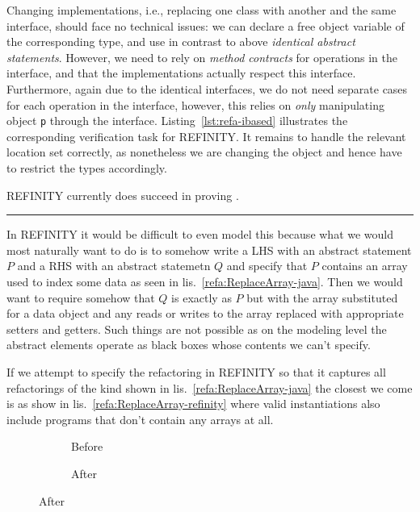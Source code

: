 Changing implementations, i.e., replacing one class with another and the same interface,
should face no technical issues: we can declare a free object variable of the corresponding type,
and use in contrast to above \textit{identical abstract statements}.
However, we need to rely on \textit{method contracts} for operations in the interface, and that the implementations actually respect this interface.
Furthermore, again due to the identical interfaces, we do not need separate cases for each operation in the interface,
however, this relies on \textit{only} manipulating object \texttt{p} through the interface.
Listing~\ref{lst:refa-ibased} illustrates the corresponding verification task for REFINITY.
It remains to handle the relevant location set correctly, as nonetheless we are changing the object and hence have to restrict the types accordingly.

REFINITY currently does  succeed in proving .

\noindent\rule{\textwidth}{2pt}


In REFINITY it would be difficult to even model this because what we would most naturally want to do is to somehow write a LHS with an abstract statement $P$ and a RHS with an abstract statemetn $Q$ and specify that $P$ contains an array used to index some data as seen in lis.~\ref{refa:ReplaceArray-java}. Then we would want to require somehow that $Q$ is exactly as $P$ but with the array substituted for a data object and any reads or writes to the array replaced with appropriate setters and getters. Such things are not possible as on the modeling level the abstract elements operate as black boxes whose contents we can't specify.

If we attempt to specify the refactoring in REFINITY so that it captures all refactorings of the kind shown in lis.~\ref{refa:ReplaceArray-java} the closest we come is as show in lis.~\ref{refa:ReplaceArray-refinity} where valid instantiations
also include programs that don't contain any arrays at all.

\begin{figure}
  \begin{subfigure}[h]{.45\linewidth} 
    
    \caption{Before}
    \label{refa:ReplaceArray-refinity-before}   
  \end{subfigure}\hspace{1cm}
  \begin{subfigure}[h]{.45\linewidth}
    
    \caption{After}
    \label{refa:ReplaceArray-refinity--after}
  \end{subfigure}
  \label{lst:ReplaceArray-refinity}
\end{figure}

